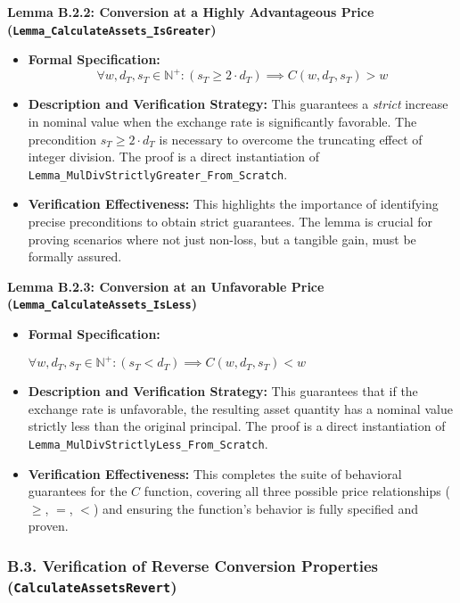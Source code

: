 \documentclass[
  english,
  onecolumn]{article}
\providecommand{\tightlist}{%
  \setlength{\itemsep}{0pt}\setlength{\parskip}{0pt}}
\begin{document}
\textbf{Lemma B.2.2: Conversion at a Highly Advantageous Price
(\texttt{Lemma\_CalculateAssets\_IsGreater})}

\begin{itemize}
\tightlist
\item
  \textbf{Formal Specification:}
  \[ \forall w, d_T, s_T \in \mathbb{N}^+ : (s_T \ge 2 \cdot d_T) \implies C(w, d_T, s_T) > w \]
\item
  \textbf{Description and Verification Strategy:} This guarantees a
  \emph{strict} increase in nominal value when the exchange rate is
  significantly favorable. The precondition \(s_T \ge 2 \cdot d_T\) is
  necessary to overcome the truncating effect of integer division. The
  proof is a direct instantiation of
  \texttt{Lemma\_MulDivStrictlyGreater\_From\_Scratch}.
\item
  \textbf{Verification Effectiveness:} This highlights the importance of
  identifying precise preconditions to obtain strict guarantees. The
  lemma is crucial for proving scenarios where not just non-loss, but a
  tangible gain, must be formally assured.
\end{itemize}

\textbf{Lemma B.2.3: Conversion at an Unfavorable Price
(\texttt{Lemma\_CalculateAssets\_IsLess})}

\begin{itemize}
\item
  \textbf{Formal Specification:}

  \(\forall w, d_T, s_T \in \mathbb{N}^+ : (s_T < d_T) \implies C(w, d_T, s_T) < w\)
\item
  \textbf{Description and Verification Strategy:} This guarantees that
  if the exchange rate is unfavorable, the resulting asset quantity has
  a nominal value strictly less than the original principal. The proof
  is a direct instantiation of
  \texttt{Lemma\_MulDivStrictlyLess\_From\_Scratch}.
\item
  \textbf{Verification Effectiveness:} This completes the suite of
  behavioral guarantees for the \(C\) function, covering all three
  possible price relationships (\(\ge\), \(=\), \(<\)) and ensuring the
  function's behavior is fully specified and proven.
\end{itemize}

\subsubsection{\texorpdfstring{B.3. Verification of Reverse Conversion
Properties
(\texttt{CalculateAssetsRevert})}{B.3. Verification of Reverse Conversion Properties (CalculateAssetsRevert)}}\label{b.3.-verification-of-reverse-conversion-properties-calculateassetsrevert}
\end{document}

